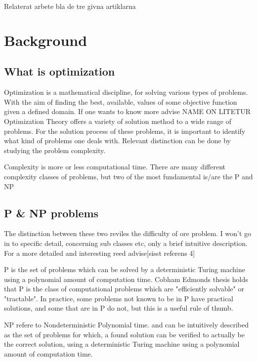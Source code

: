 Relaterat arbete bla de tre givna artiklarna 

\section{Background}

\subsection{What is optimization}

Optimization is a mathematical discipline, for solving various types of problems. With the aim of finding the best, available, values of some objective function given a defined domain. If one wants to know more advise NAME ON LITETUR\\

Optimization Theory offers a variety of solution method to a wide range of problems. For the solution process of these problems, it is important to identify what kind of problems one deals with.
Relevant distinction can be done by studying the problem complexity.

Complexity is more or less computational time. There are many different complexity classes of problems, but two of the most fundamental is/are the P and NP

\subsection{P \& NP problems}

The distinction between these two reviles the difficulty of ore problem. I won't go in to specific detail, concerning sub classes etc, only a brief intuitive description.
For a more detailed and interesting reed advise[sisst referens 4]

P is the set of problems which can be solved by a deterministic Turing machine using a polynomial amount of computation time.
Cobham Edmonds thesis holds that P is the class of computational problems which are "efficiently solvable" or "tractable". In practice, some problems not known to be in P have practical solutions, and some that are in P do not, but this is a useful rule of thumb.

NP refere to Nondeterministic Polynomial time. and can be intuitively described as the set of problems for which, a found solution can be verified to actually be the correct solution, using a deterministic Turing machine using a polynomial amount of computation time.

